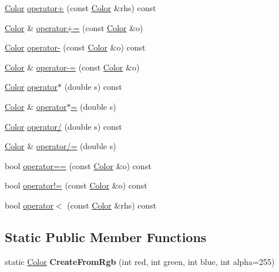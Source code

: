 \begin{DoxyCompactItemize}
\item 
\hyperlink{classastu_1_1Color}{Color} \hyperlink{classastu_1_1Color_aca7e48a64d881e1287805f52b81a7066}{operator+} (const \hyperlink{classastu_1_1Color}{Color} \&rhs) const
\item 
\hyperlink{classastu_1_1Color}{Color} \& \hyperlink{classastu_1_1Color_af4c777a4e4cf3a7770d8499c4fa10c3e}{operator+=} (const \hyperlink{classastu_1_1Color}{Color} \&o)
\item 
\hyperlink{classastu_1_1Color}{Color} \hyperlink{classastu_1_1Color_ad9b6a108bc2d6581ad97057a00d2008f}{operator-\/} (const \hyperlink{classastu_1_1Color}{Color} \&o) const
\item 
\hyperlink{classastu_1_1Color}{Color} \& \hyperlink{classastu_1_1Color_ab80bfd9e234b9caed6900afea9a0ea2e}{operator-\/=} (const \hyperlink{classastu_1_1Color}{Color} \&o)
\item 
\hyperlink{classastu_1_1Color}{Color} \hyperlink{classastu_1_1Color_a287594eff638030b35765bfe00e76606}{operator$\ast$} (double s) const
\item 
\hyperlink{classastu_1_1Color}{Color} \& \hyperlink{classastu_1_1Color_adf79aa3c1511b986cb7ac14d32524ad4}{operator$\ast$=} (double s)
\item 
\hyperlink{classastu_1_1Color}{Color} \hyperlink{classastu_1_1Color_a9be3b7a9a3773bc7f82a2cd6ac6badbf}{operator/} (double s) const
\item 
\hyperlink{classastu_1_1Color}{Color} \& \hyperlink{classastu_1_1Color_afd37b7940911dd15ef36bae5a046033c}{operator/=} (double s)
\item 
bool \hyperlink{classastu_1_1Color_aa1b234404e692bd343d026f03c7b9832}{operator==} (const \hyperlink{classastu_1_1Color}{Color} \&o) const
\item 
bool \hyperlink{classastu_1_1Color_ad55ea16978ae52e3feb77109865921bd}{operator!=} (const \hyperlink{classastu_1_1Color}{Color} \&o) const
\item 
bool \hyperlink{classastu_1_1Color_a23c1c73e9815bdbae91de67d54f25cb8}{operator$<$} (const \hyperlink{classastu_1_1Color}{Color} \&rhs) const
\end{DoxyCompactItemize}
\subsection*{Static Public Member Functions}
\begin{DoxyCompactItemize}
\item 
\mbox{\label{classastu_1_1Color_a4cec5d96b38d05757c0ead266e591397}} 
static \hyperlink{classastu_1_1Color}{Color} {\bfseries Create\+From\+Rgb} (int red, int green, int blue, int alpha=255)
\end{DoxyCompactItemize}
